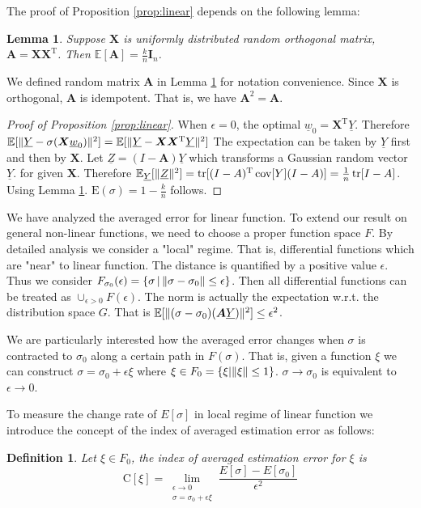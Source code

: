 \documentclass[conference,letterpaper]{IEEEtran}
\newtheorem{definition}{Definition}
\newtheorem{lemma}{Lemma}
\DeclarePairedDelimiter\norm{\lVert}{\rVert}
\def\E{\mathbb{E}}
\def\T{\mathrm{T}}
\DeclareMathOperator*{\Tr}{tr}
\DeclareMathOperator*{\Cov}{cov}
\begin{document}
The proof of Proposition \ref{prop:linear} depends on the following lemma:
\begin{lemma}\label{lem:A}
Suppose $\bm{X}$ is uniformly distributed random orthogonal matrix, $\bm{A} = \bm{X}\bm{X}^\T$.
Then $\E[\bm{A}] = \frac{k}{n} \mathbf{I}_n$.
\end{lemma}
We defined random matrix $\bm{A}$ in Lemma \ref{lem:A} for notation convenience.
Since $\bm{X}$ is orthogonal, $\bm{A}$ is idempotent. That is, we have $\bm{A}^2 = \bm{A}$.

\begin{proof}[Proof of Proposition \ref{prop:linear}]
When $\epsilon = 0$, the optimal $\underline{w}_0 = \bm{X}^\T\underline{Y}$. Therefore
$\E[\norm{\underline{Y} - \sigma(\bm{X} \underline{w}_0)}^2] = \E[\norm{\underline{Y}-\bm{X}\bm{X}^\T\underline{Y}}^2]$
The expectation can be taken by $\underline{Y}$ first and then by $\bm{X}$.
Let $\underline{Z} = (I-\bm{A}) \underline{Y}$ which transforms a Gaussian random vector $\underline{Y}$.
for given $\bm{X}$. Therefore $\E_{\underline{Y}}[\norm{\underline{Z}}^2] = \Tr[(I-A)^\T\Cov[Y](I-A)]
= \frac{1}{n}\Tr[I - A]$. Using Lemma \ref{lem:A}. $\mathrm{E}(\sigma) = 1 - \frac{k}{n}$ follows.
\end{proof}

We have analyzed the averaged error for linear function. To extend our result on general non-linear functions, we need to choose a proper function space $F$. By detailed analysis we consider a "local" regime. That is, differential functions which are "near" to linear function. The distance is quantified by a positive value $\epsilon$. Thus we consider $F_{\sigma_0}(\epsilon) =\{ \sigma \,|\, \norm{\sigma - \sigma_0} \leq \epsilon\}$. Then all differential functions can be treated as $\cup_{\epsilon>0} F(\epsilon)$. The norm is actually the expectation w.r.t. the distribution space $G$. That is $\E[\norm{(\sigma - \sigma_0)(\bm{A}\underline{Y})}^2] \leq \epsilon^2$.

We are particularly interested how the averaged error changes when $\sigma$ is contracted to $\sigma_0$ along a certain path in $F(\sigma)$. That is, given a function $\xi$ we can construct $\sigma = \sigma_0 + \epsilon \xi$ where $\xi \in F_0 = \{\xi | \norm{\xi} \leq 1 \}$. $\sigma \to \sigma_0$ is equivalent to $\epsilon \to 0$.

To measure the change rate of $E[\sigma]$ in local regime of linear function we introduce the concept of the index of averaged estimation error as follows:
\begin{definition}
Let $\xi \in F_0$, the index of averaged estimation error for $\xi$ is
\begin{equation}\label{eq:Cxi}
\mathrm{C}[\xi] = \lim_{\substack{\epsilon \to 0 \\ \sigma = \sigma_0 + \epsilon \xi}} \frac{E[\sigma] - E[\sigma_0]}{\epsilon^2}
\end{equation}
\end{definition}
\end{document}
